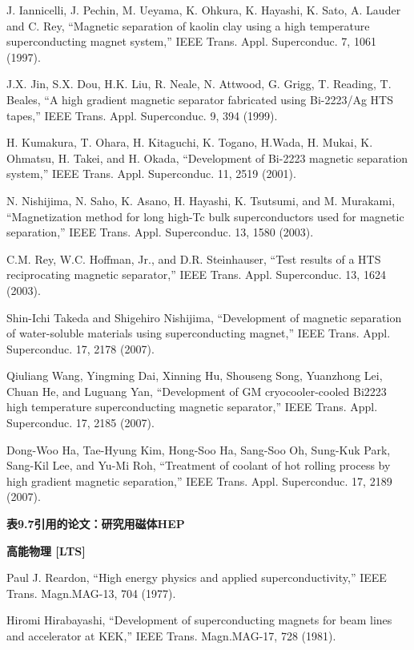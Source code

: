 \noindent [9.260] J. Iannicelli, J. Pechin, M. Ueyama, K. Ohkura, K. Hayashi, K. Sato, A. Lauder
and C. Rey, ``Magnetic separation of kaolin clay using a high temperature superconducting magnet system,” IEEE Trans. Appl. Superconduc. 7, 1061 (1997).

\noindent [9.261] J.X. Jin, S.X. Dou, H.K. Liu, R. Neale, N. Attwood, G. Grigg, T. Reading,
T. Beales, ``A high gradient magnetic separator fabricated using Bi-2223/Ag HTS
tapes,” IEEE Trans. Appl. Superconduc. 9, 394 (1999).

\noindent [9.262] H. Kumakura, T. Ohara, H. Kitaguchi, K. Togano, H.Wada, H. Mukai, K. Ohmatsu,
H. Takei, and H. Okada, ``Development of Bi-2223 magnetic separation system,”
IEEE Trans. Appl. Superconduc. 11, 2519 (2001).

\noindent [9.263] N. Nishijima, N. Saho, K. Asano, H. Hayashi, K. Tsutsumi, and M. Murakami,
``Magnetization method for long high-Tc bulk superconductors used for magnetic
separation,” IEEE Trans. Appl. Superconduc. 13, 1580 (2003).

\noindent [9.264] C.M. Rey, W.C. Hoffman, Jr., and D.R. Steinhauser, ``Test results of a HTS reciprocating
magnetic separator,” IEEE Trans. Appl. Superconduc. 13, 1624 (2003).

\noindent [9.265] Shin-Ichi Takeda and Shigehiro Nishijima, ``Development of magnetic separation
of water-soluble materials using superconducting magnet,” IEEE Trans. Appl.
Superconduc. 17, 2178 (2007).

\noindent [9.266] Qiuliang Wang, Yingming Dai, Xinning Hu, Shouseng Song, Yuanzhong Lei,
Chuan He, and Luguang Yan, ``Development of GM cryocooler-cooled Bi2223
high temperature superconducting magnetic separator,” IEEE Trans. Appl. Superconduc.
17, 2185 (2007).

\noindent [9.267] Dong-Woo Ha, Tae-Hyung Kim, Hong-Soo Ha, Sang-Soo Oh, Sung-Kuk Park,
Sang-Kil Lee, and Yu-Mi Roh, ``Treatment of coolant of hot rolling process by high
gradient magnetic separation,” IEEE Trans. Appl. Superconduc. 17, 2189 (2007).

\noindent \textbf{表9.7引用的论文：研究用磁体HEP }

\noindent \textbf{高能物理 [LTS]}

\noindent [9.268] Paul J. Reardon, ``High energy physics and applied superconductivity,” IEEE
Trans. Magn.MAG-13, 704 (1977).

\noindent [9.269] Hiromi Hirabayashi, ``Development of superconducting magnets for beam lines
and accelerator at KEK,” IEEE Trans. Magn.MAG-17, 728 (1981).

